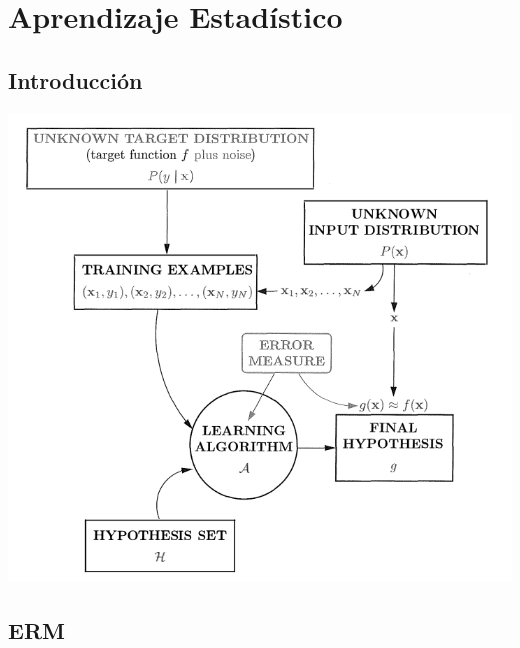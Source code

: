 \section{Aprendizaje Estadístico}



\subsection{Introducción}

    \begin{frame}
        \includegraphics[keepaspectratio=true,height=0.80\paperheight,width=1\paperwidth]{Images/Esquema AASupervisado.png}
    \end{frame}



    
\subsection{ERM}

